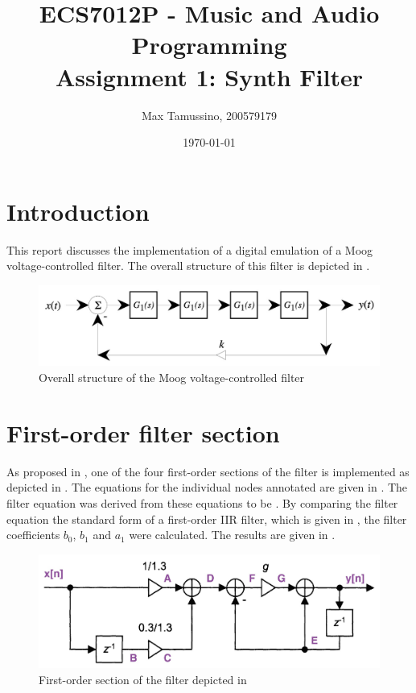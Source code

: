 \documentclass[a4paper, 12pt]{article}
\title{ECS7012P - Music and Audio Programming\\
	   Assignment 1: Synth Filter}
\author{
  Max Tamussino, 200579179
}
\date{\today}
\begin{document}
\maketitle
\tableofcontents
\pagebreak

\section{Introduction} \label{sec:intro}
This report discusses the implementation of a digital emulation of a Moog voltage-controlled filter. The overall structure of this filter is depicted in .

\begin{figure}
	\centering
	\includegraphics[width=\textwidth]{overall-structure.jpg}
	\caption{Overall structure of the Moog voltage-controlled filter \cite{Stilson1996}}
	\label{fig:overall-structure}
\end{figure}

\section{First-order filter section} \label{sec:fofs}
As proposed in \cite{Vaelimaeki2006}, one of the four first-order sections of the filter is implemented as depicted in . The equations for the individual nodes annotated are given in . The filter equation was derived from these equations to be . By comparing the filter equation the standard form of a first-order IIR filter, which is given in , the filter coefficients $b_0$, $b_1$ and $a_1$ were calculated. The results are given in .

\begin{figure}
	\centering
	\includegraphics[width=\textwidth]{first-order-section.jpg}
	\caption{First-order section of the filter depicted in  \cite{Vaelimaeki2006}}
	\label{fig:first-order-section}
\end{figure}
\end{document}
